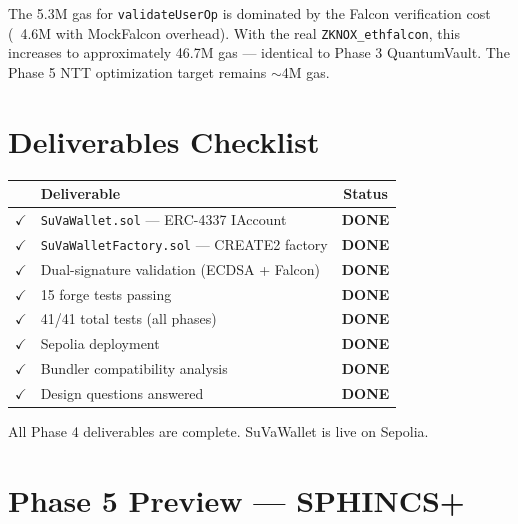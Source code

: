 \documentclass[11pt,a4paper]{article}
\begin{document}
\begin{infobox}
The 5.3M gas for \texttt{validateUserOp} is dominated by the Falcon verification cost
(~4.6M with MockFalcon overhead). With the real \texttt{ZKNOX\_ethfalcon}, this increases
to approximately 46.7M gas --- identical to Phase 3 QuantumVault. The Phase 5 NTT
optimization target remains $\sim$4M gas.
\end{infobox}

\section{Deliverables Checklist}

\begin{center}
\begin{tabular}{clc}
\toprule
& \textbf{Deliverable} & \textbf{Status} \\
\midrule
$\checkmark$ & \texttt{SuVaWallet.sol} --- ERC-4337 IAccount & \textcolor{pass-green}{\textbf{DONE}} \\
$\checkmark$ & \texttt{SuVaWalletFactory.sol} --- CREATE2 factory & \textcolor{pass-green}{\textbf{DONE}} \\
$\checkmark$ & Dual-signature validation (ECDSA + Falcon) & \textcolor{pass-green}{\textbf{DONE}} \\
$\checkmark$ & 15 forge tests passing & \textcolor{pass-green}{\textbf{DONE}} \\
$\checkmark$ & 41/41 total tests (all phases) & \textcolor{pass-green}{\textbf{DONE}} \\
$\checkmark$ & Sepolia deployment & \textcolor{pass-green}{\textbf{DONE}} \\
$\checkmark$ & Bundler compatibility analysis & \textcolor{pass-green}{\textbf{DONE}} \\
$\checkmark$ & Design questions answered & \textcolor{pass-green}{\textbf{DONE}} \\
\bottomrule
\end{tabular}
\end{center}

\begin{resultbox}
All Phase 4 deliverables are complete. SuVaWallet is live on Sepolia.
\end{resultbox}

\section{Phase 5 Preview --- SPHINCS+}
\end{document}

